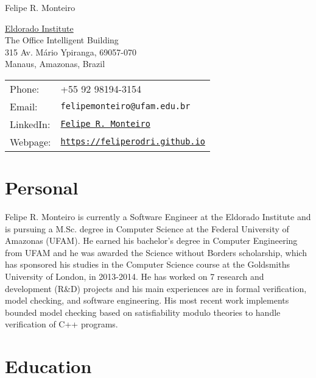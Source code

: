 \documentclass[letterpaper]{article}
\def\name{Felipe R. Monteiro}
\begin{document}
{\huge \name}


\vspace{0.25in}

\begin{minipage}{0.45\linewidth}
  \href{http://eldorado.org.br/}{Eldorado Institute} \\
  The Office Intelligent Building \\
  315 Av. M\'ario Ypiranga, 69057-070 \\
  Manaus, Amazonas, Brazil
\end{minipage}
\hfill
\begin{minipage}{0.45\linewidth}
  \begin{tabular}{ll}
    Phone: & +55 92 98194-3154 \\
    Email: & {\tt felipemonteiro@ufam.edu.br} \\
    LinkedIn: & \href{https://www.linkedin.com/in/felipe-r-monteiro-91643157/}{\tt Felipe R. Monteiro} \\
    Webpage: & \href{https://feliperodri.github.io}{\tt https://feliperodri.github.io} \\
  \end{tabular}
\end{minipage}

\section*{Personal}

Felipe R. Monteiro is currently a Software Engineer at the Eldorado Institute and is pursuing a M.Sc. degree in Computer Science at the Federal University of Amazonas (UFAM). He earned his bachelor's degree in Computer Engineering from UFAM and he was awarded the Science without Borders scholarship, which has sponsored his studies in the Computer Science course at the Goldsmiths University of London, in 2013-2014. He has worked on 7 research and development (R\&D) projects and his main experiences are in formal verification, model checking, and software engineering. His most recent work implements bounded model checking based on satisfiability modulo theories to handle verification of C++ programs.

\section*{Education}
\end{document}
